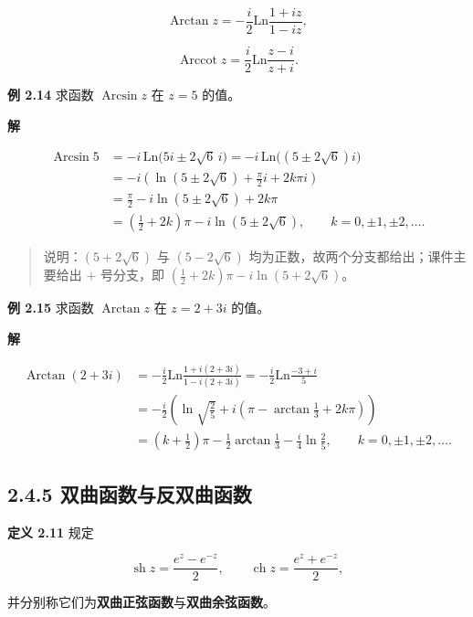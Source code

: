\[
\operatorname{Arctan}z=-\frac{i}{2}\mathrm{Ln}\frac{1+iz}{1-iz},
\]

\[
\operatorname{Arccot}z=\frac{i}{2}\mathrm{Ln}\frac{z-i}{z+i}.
\]

\textbf{例 2.14} 求函数 \(\operatorname{Arcsin}z\) 在 \(z=5\) 的值。

\textbf{解}

\[
\begin{aligned}
\operatorname{Arcsin}5
&=-i\,\mathrm{Ln}\bigl(5i\pm2\sqrt6\,i\bigr)
=-i\,\mathrm{Ln}\bigl((5\pm2\sqrt6)i\bigr)\\
&=-i\left(\ln(5\pm2\sqrt6)+\frac{\pi}{2}i+2k\pi i\right)\\
&=\frac{\pi}{2}-i\ln(5\pm2\sqrt6)+2k\pi\\
&=\left(\frac{1}{2}+2k\right)\pi-i\ln(5\pm2\sqrt6),\qquad k=0,\pm1,\pm2,\ldots .
\end{aligned}
\]

\begin{quote}
说明：\((5+2\sqrt6)\) 与 \((5-2\sqrt6)\)
均为正数，故两个分支都给出；课件主要给出 \(+\) 号分支，即
\(\left(\frac{1}{2}+2k\right)\pi-i\ln(5+2\sqrt6)\)。
\end{quote}

\textbf{例 2.15} 求函数 \(\operatorname{Arctan}z\) 在 \(z=2+3i\) 的值。

\textbf{解}

\[
\begin{aligned}
\operatorname{Arctan}(2+3i)
&=-\frac{i}{2}\mathrm{Ln}\frac{1+i(2+3i)}{1-i(2+3i)}
=-\frac{i}{2}\mathrm{Ln}\frac{-3+i}{5}\\
&=-\frac{i}{2}\left(\ln\sqrt{\frac{2}{5}}+i\left(\pi-\arctan\frac{1}{3}+2k\pi\right)\right)\\
&=\left(k+\frac{1}{2}\right)\pi-\frac{1}{2}\arctan\frac{1}{3}-\frac{i}{4}\ln\frac{2}{5},\qquad k=0,\pm1,\pm2,\ldots .
\end{aligned}
\]

\subsection{2.4.5
双曲函数与反双曲函数}\label{ux53ccux66f2ux51fdux6570ux4e0eux53cdux53ccux66f2ux51fdux6570}

\textbf{定义 2.11} 规定

\[
\operatorname{sh}z=\frac{e^z-e^{-z}}{2},\qquad
\operatorname{ch}z=\frac{e^z+e^{-z}}{2},
\]

并分别称它们为\textbf{双曲正弦函数}与\textbf{双曲余弦函数}。

